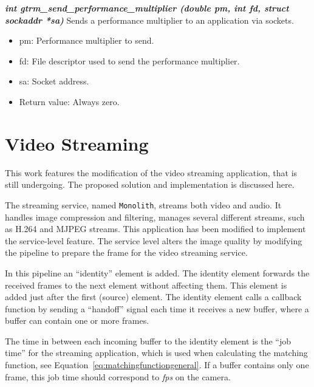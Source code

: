 \documentclass[nobiblatex]{LTHthesis}
\begin{document}
\begin{framed}
	\begin{flushleft}	
		\emph{\textbf{{int gtrm\_send\_performance\_multiplier \newline
    (double pm, int fd, struct sockaddr *sa)}}} \newline
		Sends a performance multiplier to an application via sockets.
		\begin{itemize} 
		\item pm: Performance multiplier to send.
		\item fd: File descriptor used to send the performance multiplier.
		\item sa: Socket address.
		\item Return value: Always zero.
		\end{itemize}
	\end{flushleft}
\end{framed}

\section{Video Streaming}

This work features the modification of the video streaming application,
that is still undergoing. The proposed solution and implementation is
discussed here.

The streaming service, named \texttt{Monolith}, streams both video and 
audio. It handles image compression and filtering, manages several different
streams, such as H.264 and MJPEG streams. This application has been modified
to implement the service-level feature. The service level alters the image
quality by modifying the pipeline to prepare the frame for the video
streaming service.

In this pipeline an ``identity'' element is added. The identity element
forwards the received frames to the next element without affecting them.
This element is added just after the first (source) element.
The identity element calls a callback function by sending a ``handoff'' 
signal each time it receives a new buffer, where a buffer can contain one or 
more frames.

The time in between each incoming buffer to the identity element is the 
``job time'' for the streaming application, which is used when calculating the 
matching function, see Equation~\eqref{eq:matchingfunctiongeneral}. 
If a buffer contains only one frame, this job time should correspond to 
\emph{fps} on the camera.
\end{document}

